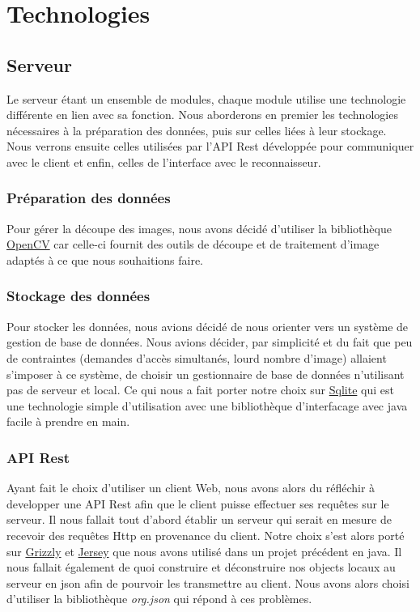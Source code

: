 \section{Technologies}

\subsection{Serveur}

Le serveur étant un ensemble de modules, chaque module utilise une technologie différente en lien avec sa fonction. Nous aborderons en premier les technologies nécessaires à la préparation des données, puis sur celles liées à leur stockage. Nous verrons ensuite celles utilisées par l'API Rest développée pour communiquer avec le client et enfin, celles de l'interface avec le reconnaisseur.

\subsubsection{Préparation des données}

Pour gérer la découpe des images, nous avons décidé d'utiliser la bibliothèque \href{https://opencv.org/}{OpenCV} car celle-ci fournit des outils de découpe et de traitement d'image adaptés à ce que nous souhaitions faire.

\subsubsection{Stockage des données}

Pour stocker les données, nous avions décidé de nous orienter vers un système de gestion de base de données. Nous avions décider, par simplicité et du fait que peu de contraintes (demandes d'accès simultanés, lourd nombre d'image) allaient s'imposer à ce système, de choisir un gestionnaire de base de données n'utilisant pas de serveur et local. Ce qui nous a fait porter notre choix sur \href{https://www.sqlite.org/index.html}{Sqlite} qui est une technologie simple d'utilisation avec une bibliothèque d'interfacage avec java facile à prendre en main.

\subsubsection{API Rest}

Ayant fait le choix d'utiliser un client Web, nous avons alors du réfléchir à developper une API Rest afin que le client puisse effectuer ses requêtes sur le serveur. Il nous fallait tout d'abord établir un serveur qui serait en mesure de recevoir des requêtes Http en provenance du client. Notre choix s'est alors porté sur \href{https://javaee.github.io/grizzly}{Grizzly} et \href{https://jersey.github.io}{Jersey} que nous avons utilisé dans un projet précédent en java. Il nous fallait également de quoi construire et déconstruire nos objects locaux au serveur en json afin de pourvoir les transmettre au client. Nous avons alors choisi d'utiliser la bibliothèque \textit{org.json} qui répond à ces problèmes.

